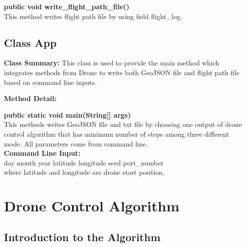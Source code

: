 \documentclass[12pt]{article}
\begin{document}
\textbf{public void write\_flight\_path\_file()}\\
This method writes flight path file by using field flight\_log.

\subsection {Class App}
\textbf{Class Summary:} This class is used to provide the main method which integrates methods from Drone to write both GeoJSON file and flight path file based on command line inputs.

\textbf{Method Detail:}

\textbf{public static void main(String[] args)}\\
This methods writes GeoJSON file and txt file by choosing one output of drone control algorithm that has minimum number of steps among three different mode. All parameters come from command line.\\
\textbf{Command Line Input:}\\
day month year latitude longitude seed port\_number\\
where latitude and longitude are drone start position.

\newpage
\section {Drone Control Algorithm}
\subsection {Introduction to the Algorithm}
\end{document}
